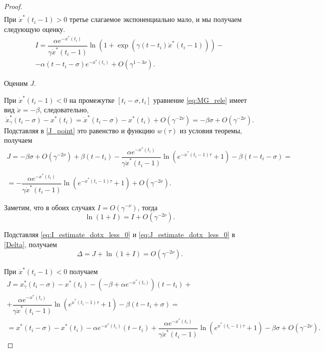 \begin{proof}
\begin{multline}
	\end{multline}
	При $\dot{x}^*(t_i - 1) > 0$ третье слагаемое экспоненциально мало, и мы получаем следующую оценку.
	\begin{multline}
		\label{eq:I_estimate_dotx_greater_0}
		I = \dfrac{\alpha e^{-x^*(t_i)}}{\gamma \dot{x}^*(t_i - 1)}\ln\left(1 + \exp(\gamma(t - t_i)\dot{x}^*(t_i - 1))\right) -\\- \alpha (t - t_i - \sigma) e^{-x^*(t_i)} + O(\gamma^{1 - 3\nu}).
	\end{multline}
	
	Оценим $J$.
	
	При $\dot{x}^*(t_i - 1) < 0$ на промежутке $[t_i - \sigma, t_i]$ уравнение \eqref{eq:MG_rele} имеет вид $\dot{x} = -\beta$, следовательно, 
	\[
	\dot{x}_{\gamma}^*(t_i - \sigma) - x^*(t_i) = \dot{x}^*(t_i - \sigma) - x^*(t_i) + O(\gamma^{-2\nu}) = -\beta \sigma + O(\gamma^{-2\nu}).
	\]
	Подставляя в \eqref{J_point} это равенство и функцию $w(\tau)$ из условия теоремы, получаем
	\begin{multline}
		\label{eq:J_estimate_dotx_less_0}
	J = -\beta \sigma + O(\gamma^{-2\nu}) + \beta (t - t_i) - \dfrac{\alpha e^{-x^*(t_i)}}{\gamma \dot{x}^*(t_i - 1)} \ln\left(e^{-\dot{x}^*(t_i - 1)\tau} + 1\right) - \beta(t - t_i - \sigma) =\\
	\\= -\dfrac{\alpha e^{-x^*(t_i)}}{\gamma \dot{x}^*(t_i - 1)} \ln\left(e^{-\dot{x}^*(t_i - 1)\tau} + 1\right) + O(\gamma^{-2\nu}).
	\end{multline}
	
	Заметим, что в обоих случаях $I = O(\gamma^{-\nu})$, тогда 
	\begin{equation}
	\label{eq:ln_1_plus_I}
	\ln(1 + I) = I + O(\gamma^{-2\nu}).
	\end{equation}
	
	Подставляя \eqref{eq:I_estimate_dotx_less_0} и \eqref{eq:J_estimate_dotx_less_0} в \eqref{Delta}, получаем
	\[
	\Delta = J + \ln(1 + I) = O(\gamma^{-2\nu}).
	\]
	
	При $\dot{x}^*(t_i - 1) < 0$ получаем
	\begin{multline}
	\label{eq:J_estimate_dotx_greater_0}
	J = x_{\gamma}^*(t_i - \sigma) - x^*(t_i) - (-\beta + \alpha e^{-x^*(t_i)})(t - t_i) +\\+ \dfrac{\alpha e^{-x^*(t_i)}}{\gamma \dot{x}^*(t_i - 1)} \ln\left(e^{\dot{x}^*(t_i - 1)\tau} + 1\right) - \beta(t - t_i + \sigma) =\\
	= x^*(t_i - \sigma) - x^*(t_i) - \alpha e^{-x^*(t_i)}(t - t_i) + \dfrac{\alpha e^{-x^*(t_i)}}{\gamma \dot{x}^*(t_i - 1)} \ln\left(e^{\dot{x}^*(t_i - 1)\tau} + 1\right) - \beta\sigma + O(\gamma^{-2\nu}).
	\end{multline}
	

\end{proof}

